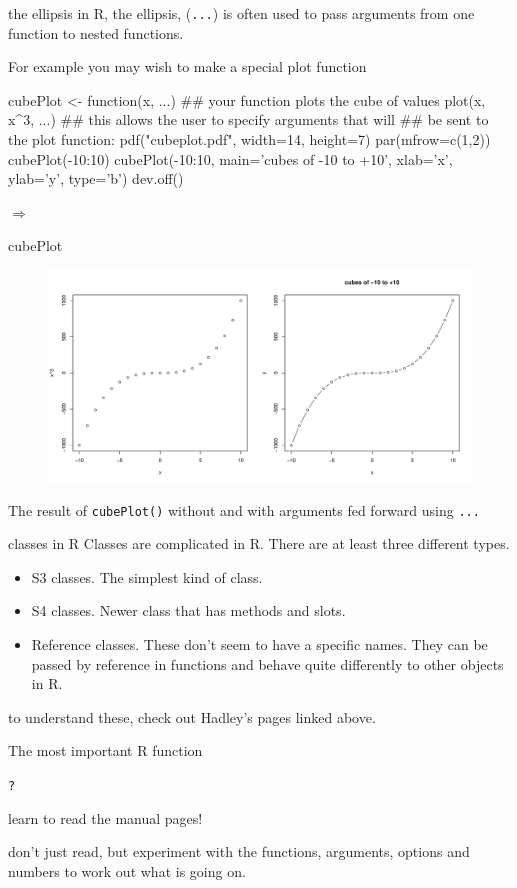 \documentclass[pdf]{beamer}
\begin{document}
\begin{frame}[fragile]{the ellipsis}
  in R, the ellipsis, (\texttt{...}) is often used to
  pass arguments from one function to nested functions.

  For example you may wish to make a special plot function
  
  \begin{rcode}
    cubePlot <- function(x, ...){
      ## your function plots the cube of values
      plot(x, x^3, ...)
    }
    ## this allows the user to specify arguments that will
    ## be sent to the plot function:
    pdf("cubeplot.pdf", width=14, height=7)
    par(mfrow=c(1,2))
    cubePlot(-10:10)
    cubePlot(-10:10, main='cubes of -10 to +10', xlab='x', ylab='y', type='b')
    dev.off()
  \end{rcode}

  \huge $\Rightarrow$
\end{frame}

\begin{frame}{cubePlot}
  \begin{figure}[ht]
    \includegraphics[width=\textwidth]{images/cubeplot.pdf}
  \end{figure}

  The result of \texttt{cubePlot()} without and with arguments
  fed forward using \texttt{...}
\end{frame}

\begin{frame}{classes in R}
  Classes are complicated in R. There are at least three different types.

  \begin{itemize}
  \item S3 classes. The simplest kind of class.
  \item S4 classes. Newer class that has methods and slots.
  \item Reference classes. These don't seem to have a specific names.
    They can be passed by reference in functions and behave quite differently
    to other objects in R.
  \end{itemize}
  
  to understand these, check out Hadley's pages linked above.
\end{frame}

\begin{frame}{The most important R function}

\texttt{?}

learn to read the manual pages!

don't just read, but experiment with the functions, arguments, options
and numbers to work out what is going on.
\end{frame}
\end{document}
